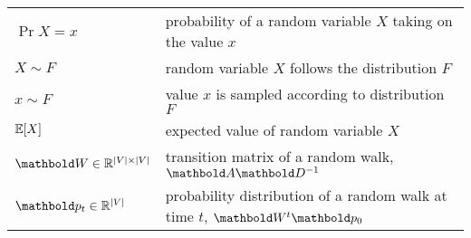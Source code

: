 \begin{fullwidth}
\section*{}\vspace{-0.5cm}
\begin{longtable}{p{2.5cm}l}
   $\Pr{X = x}$ & probability of a random variable $X$ taking on the value $x$ \\
   $X \sim F$ & random variable $X$ follows the distribution $F$ \\
   $x \sim F$ & value $x$ is sampled according to distribution $F$ \\
   $\E{X}$ & expected value of random variable $X$ \\
   $\mW \in \R^{|\sV|\times|\sV|}$ & transition matrix of a random walk, $\mA\inv{\mD}$ \\
   $\vp_t \in \R^{|\sV|}$ & probability distribution of a random walk at time $t$, $\mW^t\vp_0$ \\
\end{longtable}


\end{fullwidth}
